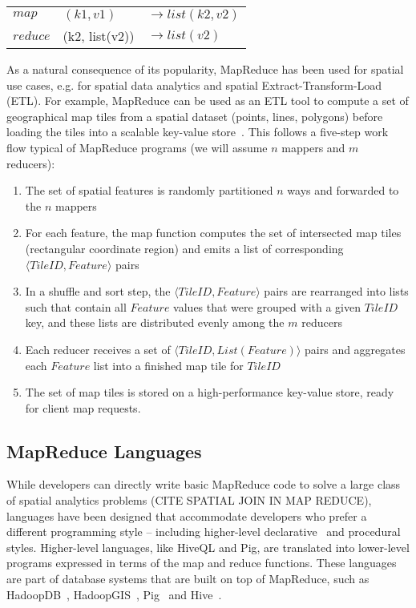 \documentclass[11pt, oneside]{report}   	%
\begin{document}
\begin{tabular}{l l l}
$map$ & $(k1, v1)$ & $\rightarrow list(k2, v2)$\\ 
$reduce$ & (k2, list(v2)) & $\rightarrow list(v2)$ \\
\end{tabular}

As a natural consequence of its popularity, MapReduce has been used for spatial use cases, e.g. for spatial data analytics and spatial Extract-Transform-Load (ETL). For example, MapReduce can be used as an ETL tool to compute a set of geographical map tiles from a spatial dataset (points, lines, polygons) before loading the tiles into a scalable key-value store~\cite{dean2009lessons}. This follows a five-step work flow typical of MapReduce programs (we will assume $n$ mappers and $m$ reducers):

\begin{enumerate}
\item The set of spatial features is randomly partitioned $n$ ways and forwarded to the $n$ mappers

\item For each feature, the map function computes the set of intersected map tiles (rectangular coordinate region) and emits a list of corresponding $\langle TileID, Feature \rangle$ pairs

\item In a shuffle and sort step, the $\langle TileID, Feature \rangle$ pairs are rearranged into lists such that contain all $Feature$ values that were grouped with a given $TileID$ key, and these lists are distributed evenly among the $m$ reducers

\item Each reducer receives a set of $\langle TileID, List(Feature) \rangle$ pairs and aggregates each $Feature$ list into a finished map tile for $TileID$

\item The set of map tiles is stored on a high-performance key-value store, ready for client map requests. 
\end{enumerate}

\subsection{MapReduce Languages}

While developers can directly write basic MapReduce code to solve a large class of spatial analytics problems (CITE SPATIAL JOIN IN MAP REDUCE), languages have been designed that accommodate developers who prefer a different programming style -- including higher-level declarative~\cite{thusoo2009hive} and procedural~\cite{olston2008pig,eldawy2014pigeon} styles. Higher-level languages, like HiveQL and Pig, are translated into lower-level programs expressed in terms of the map and reduce functions. These languages are part of database systems that are built on top of MapReduce, such as HadoopDB~\cite{abouzeid2009hadoopdb}, HadoopGIS~\cite{aji2013hadoopgis}, Pig~\cite{eldawy2014pigeon, olston2008pig} and Hive~\cite{thusoo2009hive}.
\end{document}
